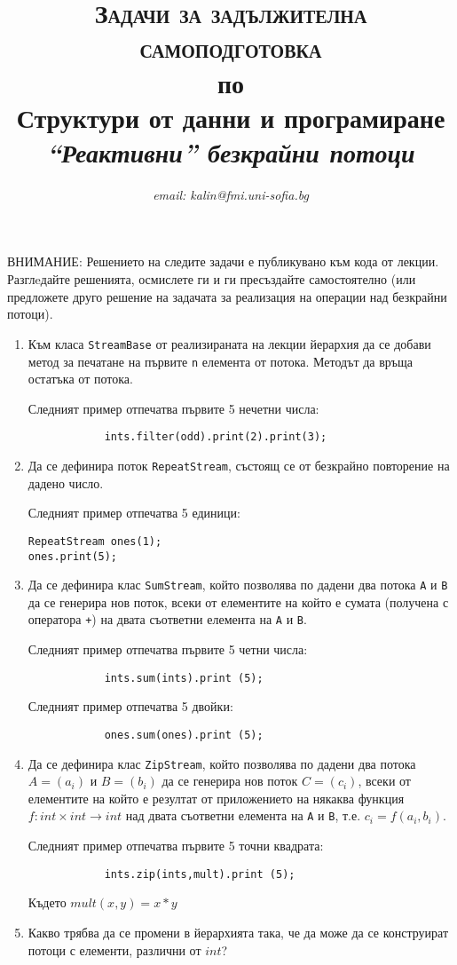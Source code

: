 \documentclass[12pt,a4paper]{article}
\author{\textit{email: kalin@fmi.uni-sofia.bg}}
\title{\textsc{Задачи за задължителна самоподготовка} \\
по \\
Структури от данни и програмиране\\
\textit{``Реактивни'' безкрайни потоци}}
\begin{document}
\maketitle


ВНИМАНИЕ: Решението на следите задачи е публикувано към кода от лекции. Разглeдайте решенията, осмислете ги и ги пресъздайте самостоятелно (или предложете друго решение на задачата за реализация на операции над безкрайни потоци).

\begin{enumerate}

	\item  Към класа \texttt{StreamBase} от реализираната на лекции йерархия да се добави метод за печатане на първите \texttt{n} елемента от потока. Методът да връща остатъка от потока.


	Следният пример отпечатва първите 5 нечетни числа:
	\begin{verbatim}
			ints.filter(odd).print(2).print(3);
	\end{verbatim}

	\item Да се дефинира поток \texttt{RepeatStream}, състоящ се от безкрайно повторение на дадено число.

	Следният пример отпечатва 5 единици:
	\begin{verbatim}
RepeatStream ones(1);
ones.print(5);
	\end{verbatim}


	\item Да се дефинира клас \texttt{SumStream}, който позволява по дадени два потока \texttt{A} и \texttt{B} да се генерира нов поток, всеки от елементите на който е сумата (получена с оператора \texttt{+}) на двата съответни елемента на \texttt{A} и \texttt{B}.

	Следният пример отпечатва първите 5 четни числа:
	\begin{verbatim}
			ints.sum(ints).print (5);
	\end{verbatim}

	Следният пример отпечатва 5 двойки:
	\begin{verbatim}
			ones.sum(ones).print (5);
	\end{verbatim}


	\item Да се дефинира клас \texttt{ZipStream}, който позволява по дадени два потока $A=(a_i)$ и $B=(b_i)$ да се генерира нов поток $C=(c_i)$, всеки от елементите на който е резултат от приложението на някаква функция $f:int \times int \rightarrow int$ над двата съответни елемента на \texttt{A} и \texttt{B}, т.е. $c_i=f(a_i,b_i)$.

	Следният пример отпечатва първите 5 точни квадрата:
	\begin{verbatim}
			ints.zip(ints,mult).print (5);
	\end{verbatim}
	 Където $mult(x,y)=x*y$

	 \item Какво трябва да се промени в йерархията така, че да може да се конструират потоци с елементи, различни от $int$?

\end{enumerate}


	\vspace{20px}
\end{document}
